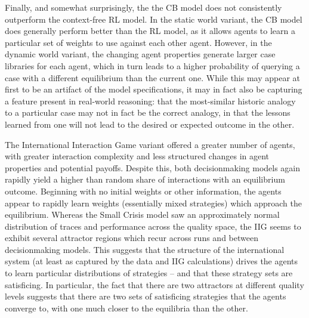 Finally, and somewhat surprisingly, the the CB model does not consistently outperform the context-free RL model. In the static world variant, the CB model does generally perform better than the RL model, as it allows agents to learn a particular set of weights to use against each other agent. However, in the dynamic world variant, the changing agent properties generate larger case libraries for each agent, which in turn leads to a higher probability of querying a case with a different equilibrium than the current one. While this may appear at first to be an artifact of the model specifications, it may in fact also be capturing a feature present in real-world reasoning: that the most-similar historic analogy to a particular case may not in fact be the correct analogy, in that the lessons learned from one will not lead to the desired or expected outcome in the other.

The International Interaction Game variant offered a greater number of agents, with greater interaction complexity and less structured changes in agent properties and potential payoffs. Despite this, both decisionmaking models again rapidly yield a higher than random share of interactions with an equilibrium outcome. Beginning with no initial weights or other information, the agents appear to rapidly learn weights (essentially mixed strategies) which approach the equilibrium. Whereas the Small Crisis model saw an approximately normal distribution of traces and performance across the quality space, the IIG seems to exhibit several attractor regions which recur across runs and between decisionmaking models. This suggests that the structure of the international system (at least as captured by the data and IIG calculations) drives the agents to learn particular distributions of strategies -- and that these strategy sets are satisficing. In particular, the fact that there are two attractors at different quality levels suggests that there are two sets of satisficing strategies that the agents converge to, with one much closer to the equilibria than the other.

